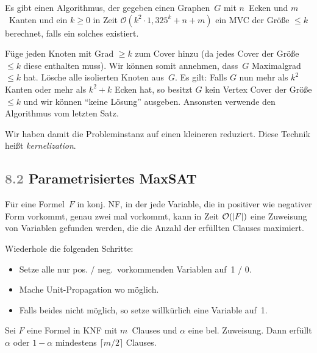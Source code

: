 \documentclass{cheat-sheet}
\newcommand{\size}[1]{\abs{#1}} %
\renewcommand{\O}{\mathcal{O}} %
\newcommand{\ceil}[1]{\lceil #1 \rceil} %
\newcommand{\Problem}[1]{\textcolor{ProblemColor}{\textbf{#1}}}
\newcommand{\scriptSection}[1]{\textcolor{gray}{#1}\enspace}
\begin{document}
\begin{satz}
  Es gibt einen Algorithmus, der gegeben einen Graphen~$G$ mit $n$~Ecken und $m$~Kanten und ein $k \geq 0$ in Zeit $\O(k^2 \cdot 1,325^{k} + n + m)$ ein MVC der Größe $\leq k$ berechnet, falls ein solches existiert.
\end{satz}

\begin{idee}
  Füge jeden Knoten mit Grad $\geq k$ zum Cover hinzu (da jedes Cover der Größe $\leq k$ diese enthalten muss).
  Wir können somit annehmen, dass~$G$ Maximalgrad $\leq k$ hat.
  Lösche alle isolierten Knoten aus~$G$.
  Es gilt: Falls $G$ nun mehr als $k^2$ Kanten oder mehr als $k^2 + k$ Ecken hat, so besitzt $G$ kein Vertex Cover der Größe $\leq k$ und wir können "`keine Lösung"' ausgeben.
  Ansonsten verwende den Algorithmus vom letzten Satz.
\end{idee}

\begin{bem}
  Wir haben damit die Probleminstanz auf einen kleineren  reduziert.
  Diese Technik heißt \textit{kernelization}.
\end{bem}

\subsection{\scriptSection{8.2} Parametrisiertes \Problem{MaxSAT}}


\begin{lem}
  Für eine Formel~$F$ in konj. NF, in der jede Variable, die in positiver wie negativer Form vorkommt, genau zwei mal vorkommt, kann in Zeit $\O(\size{F})$ eine Zuweisung von Variablen gefunden werden, die die Anzahl der erfüllten Clauses maximiert.
\end{lem}

\begin{alg}
  Wiederhole die folgenden Schritte:
  \begin{itemize}
    \item Setze alle nur pos. / neg.\ vorkommenden Variablen auf~1 / 0.
    \item Mache Unit-Propagation wo möglich.
    \item Falls beides nicht möglich, so setze willkürlich eine Variable auf~1.
  \end{itemize}
\end{alg}

\begin{beob}
  Sei $F$ eine Formel in KNF mit $m$~Clauses und $\alpha$ eine bel. Zuweisung.
  Dann erfüllt $\alpha$ oder $1 - \alpha$ mindestens $\ceil{m/2}$ Clauses.
\end{beob}
\end{document}
